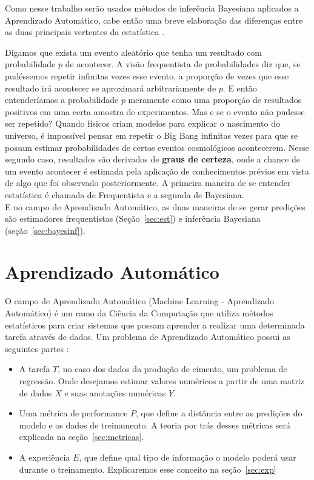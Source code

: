Como nesse trabalho serão usados métodos de inferência Bayesiana aplicados a Aprendizado Automático,
cabe então uma breve elaboração das diferenças entre as duas principais
vertentes da estatística \citep{dlbook}. 

Digamos que exista um evento aleatório que tenha um resultado com probabilidade
$p$ de acontecer. A visão frequentista de probabilidades diz que, se pudéssemos repetir infinitas vezes esse evento, a proporção de vezes que esse resultado irá acontecer se aproximará arbitrariamente de $p$. E então entenderíamos a probabilidade $p$ meramente como uma proporção de resultados positivos em uma certa amostra de experimentos. Mas e se o evento não pudesse ser repetido? Quando físicos criam modelos para explicar o nascimento do universo, é impossível pensar em repetir o Big Bang infinitas vezes para que se possam estimar probabilidades de certos eventos cosmológicos acontecerem. Nesse segundo caso, resultados são derivados de \textbf{graus de certeza}, onde a chance de um evento acontecer é estimada pela aplicação de conhecimentos prévios em vista de algo que foi observado posteriormente. A primeira maneira de se entender estatística é chamada de Frequentista e a segunda de Bayesiana. \\

E no campo de Aprendizado Automático, as duas maneiras de se gerar predições são estimadores
frequentistas (Seção~\ref{sec:est}) e inferência Bayesiana (seção~\ref{sec:bayesinf}).



\section{Aprendizado Automático}

O campo de Aprendizado Automático (Machine Learning - Aprendizado Automático) é um ramo da Ciência
da Computação que utiliza métodos estatísticos para criar sistemas que possam
aprender a realizar uma determinada tarefa através de dados. Um problema de Aprendizado Automático possui
as seguintes partes \citep{dlbook}: \\

\begin{itemize}

  
\item A tarefa $T$, no caso dos dados da produção de cimento, um problema de regressão.
  Onde desejamos estimar valores numéricos a partir de uma matriz de dados $X$ e
  suas anotações numéricas $Y$. 
  
\item Uma métrica de performance $P$, que define a distância entre as predições
  do modelo e os dados de treinamento. A teoria por trás desses métricas será explicada na seção~\ref{sec:metricas}.

\item A experiência $E$, que define qual tipo de informação o modelo poderá usar
  durante o treinamento. Explicaremos esse conceito na seção~\ref{sec:exp} 
  
\end{itemize}

